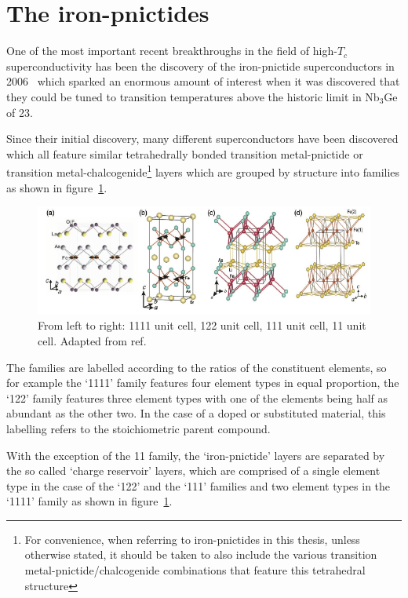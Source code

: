
\section{The iron-pnictides}

One of the most important recent breakthroughs in the field of high-$T_c$ superconductivity has been the discovery of the iron-pnictide superconductors in 2006~\cite{Kamihara2006, Kamihara2008} which sparked an enormous amount of interest when it was discovered that they could be tuned to transition temperatures above the historic limit in Nb$_3$Ge of \unit{23}{\kelvin}\cite{Attfield2010}.

Since their initial discovery, many different superconductors have been discovered which all feature similar tetrahedrally bonded transition metal-pnictide or transition metal-chalcogenide\footnote{For convenience, when referring to iron-pnictides in this thesis, unless otherwise stated, it should be taken to also include the various transition metal-pnictide/chalcogenide combinations that feature this tetrahedral structure} layers which are grouped by structure into families as shown in figure~\ref{Fig:Intro:PnictideUnitCells}.
\begin{figure}[htbp]
    \begin{center}
        \includegraphics[scale=1.1]{Chapter-Introduction/Figures/PnictideUnitCells/PnictideUnitCells}
        \caption{From left to right: 1111 unit cell, 122 unit cell, 111 unit cell, 11 unit cell. Adapted from ref.~\cite{Johnston2010}}
        \label{Fig:Intro:PnictideUnitCells}
    \end{center}
\end{figure}
The families are labelled according to the ratios of the constituent elements, so for example the `1111' family features four element types in equal proportion, the `122' family features three element types with one of the elements being half as abundant as the other two. In the case of a doped or substituted material, this labelling refers to the stoichiometric parent compound. 

With the exception of the 11 family, the `iron-pnictide' layers are separated by the so called `charge reservoir' layers, which are comprised of a single element type in the case of the `122' and the `111' families and two element types in the `1111' family as shown in figure~\ref{Fig:Intro:PnictideUnitCells}.

